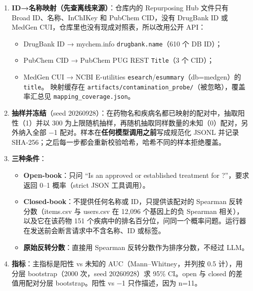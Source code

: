 \documentclass[
  10pt,
]{ctexart}
\providecommand{\tightlist}{%
  \setlength{\itemsep}{0pt}\setlength{\parskip}{0pt}}
\begin{document}
\begin{enumerate}
\def\labelenumi{\arabic{enumi}.}
\tightlist
\item
  \textbf{ID→名称映射（先查离线来源）}：仓库内的 Repurposing Hub
  文件只有 Broad ID、名称、InChIKey 和 PubChem CID，没有 DrugBank ID 或
  MedGen CUI，仓库里也没有现成对照表，所以改用公开 API：

  \begin{itemize}
  \tightlist
  \item
    DrugBank ID → mychem.info \texttt{drugbank.\allowbreak{}name}（610 个 DB ID）；
  \item
    PubChem CID → PubChem PUG REST \texttt{Title}（3 个 CID）；
  \item
    MedGen CUI → NCBI E-utilities
    \texttt{esearch}/\texttt{esummary}（db=medgen）的 \texttt{title}。
    映射缓存在
    \texttt{artifacts/\allowbreak{}contamination\_\allowbreak{}probe/\allowbreak{}}（被忽略），覆盖率汇总见
    \texttt{mapping\_\allowbreak{}coverage.\allowbreak{}json}。
  \end{itemize}
\item
  \textbf{抽样并冻结}（seed
  20260928）：在药物名和疾病名都已映射的配对中，抽取阳性（1）并以 300
  为上限随机抽样，再随机抽取同样数量的未知（0）配对，另外纳入全部 −1
  配对。样本在\textbf{任何模型调用之前}写成规范化 JSONL 并记录
  SHA-256；之后每一步都会重新校验哈希，哈希不同的样本拒绝覆盖。
\item
  \textbf{三种条件}：

  \begin{itemize}
  \tightlist
  \item
    \textbf{Open-book}：只问 ``Is an approved or established treatment
    for ?''，要求返回 0--1 概率（strict JSON 工具调用）。
  \item
    \textbf{Closed-book}：不提供任何名称或 ID，只提供该配对的 Spearman
    反转分数（items.csv 与 users.csv 在 12,096 个基因上的负 Spearman
    相关），以及它在该药物 151
    个疾病中的排名百分位，问同一个概率问题。运行器在发送前会断言请求中不含名称、ID
    或标签。
  \item
    \textbf{原始反转分数}：直接用 Spearman 反转分数作为排序分数，不经过
    LLM。
  \end{itemize}
\item
  \textbf{指标}：主指标是阳性 vs 未知的 AUC（Mann--Whitney，并列按 0.5
  计），用分层 bootstrap（2000 次，seed 20260928）求 95\% CI。open 与
  closed 的差值用配对分层 bootstrap。阳性 vs −1 只作描述，因为 n=11。
\end{enumerate}
\end{document}
